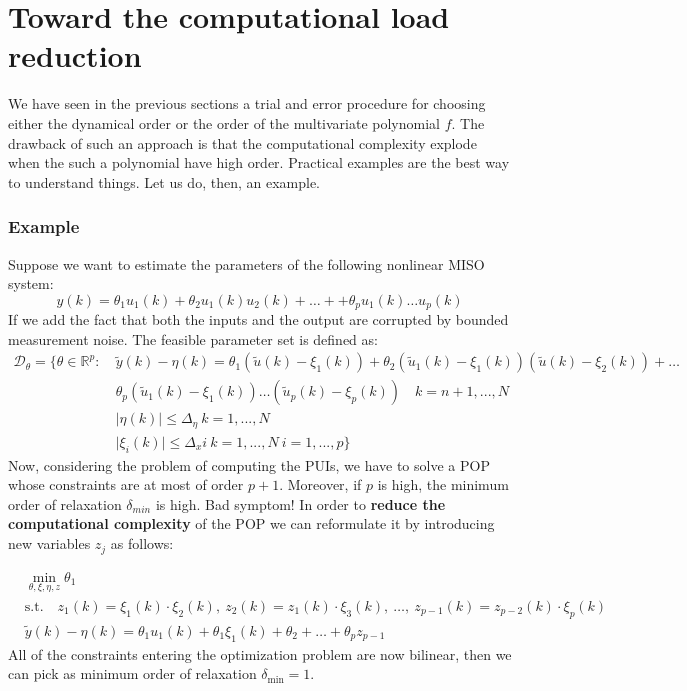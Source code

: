 \section{Toward the computational load reduction}
We have seen in the previous sections a trial and error procedure for choosing either the dynamical order or the order of the multivariate polynomial $f$. The drawback of such an approach is that the computational complexity explode when the such a polynomial have high order. Practical examples are the best way to understand things. Let us do, then, an example.

\subsubsection{Example}
Suppose we want to estimate the parameters of the following nonlinear MISO system:
\begin{equation*}
    y(k)=\theta_1{u_1(k)}+\theta_2{u_1(k)u_2(k)}+\dots+
    +\theta_p{u_1(k)\dots{u_p(k)}}
\end{equation*}
If we add the fact that both the inputs and the output are corrupted by bounded measurement noise. The feasible parameter set is defined as:
\begin{equation}
    \begin{aligned}
        \mathcal{D}_\theta = \{
        \theta\in\mathbb{R}^p: \ &\tilde{y}(k)-\eta(k) = \theta_1 (\tilde{u}(k)-\xi_1(k)) + \theta_2 (\tilde{u}_1(k)-\xi_1(k)) (\tilde{u}(k)-\xi_2(k)) +\dots\\
        &\theta_p (\tilde{u}_1(k)-\xi_1(k))\dots(\tilde{u}_p(k)-\xi_p(k)) \quad k=n+1,...,N\\
        &\vert \eta(k) \vert \le \Delta_\eta \ k=1,...,N\\
        &\vert \xi_i(k) \vert \le \Delta_xi \ k=1,...,N \ i=1,...,p
    \}
    \end{aligned}
\end{equation}
Now, considering the problem of computing the PUIs, we have to solve a POP whose constraints are at most of order $p+1$. Moreover, if $p$ is high, the minimum order of relaxation $\delta_{min}$ is high. Bad symptom! In order to \textbf{reduce the computational complexity} of the POP we can reformulate it by introducing new variables $z_j$ as follows:

\begin{equation*}
    \begin{aligned}
        &\min_{\theta,\xi,\eta,z}  \theta_1\\
        &\text{s.t.} \quad z_1(k)=\xi_1(k)\cdot\xi_2(k), \ 
        z_2(k)=z_1(k)\cdot\xi_3(k), \ \dots, \ z_{p-1}(k)=z_{p-2}(k)\cdot{\xi_p}(k)\\
        &\tilde{y}(k)-\eta(k)=\theta_1{u_1(k)}+\theta_1{\xi_1(k)}+\theta_2+\dots+\theta_p{z_{p-1}}
    \end{aligned}
\end{equation*}
All of the constraints entering the optimization problem are now bilinear, then we can pick as minimum order of relaxation $\delta_{\min}=1$.

